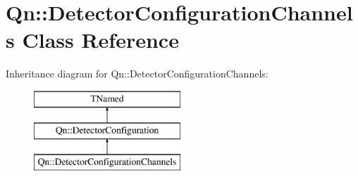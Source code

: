 \hypertarget{classQn_1_1DetectorConfigurationChannels}{}\section{Qn\+:\+:Detector\+Configuration\+Channels Class Reference}
\label{classQn_1_1DetectorConfigurationChannels}
Inheritance diagram for Qn\+:\+:Detector\+Configuration\+Channels\+:\begin{figure}[H]
\begin{center}
\leavevmode
\includegraphics[height=3.000000cm]{classQn_1_1DetectorConfigurationChannels}
\end{center}
\end{figure}
